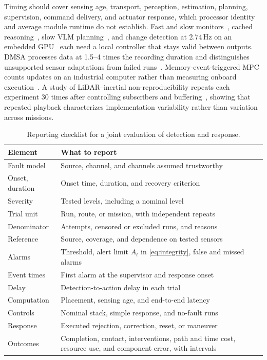 Timing should cover sensing age, transport, perception, estimation, planning, supervision, command delivery, and actuator response, which processor identity and average module runtime do not establish. Fast and slow monitors~\cite{P_F07}, cached reasoning~\cite{P_E60}, slow VLM planning~\cite{P_R26}, and change detection at 2.74\,Hz on an embedded GPU~\cite{P_R07} each need a local controller that stays valid between outputs. DMSA processes data at 1.5--4 times the recording duration and distinguishes unsupported sensor adaptations from failed runs~\cite{P_N20}. Memory-event-triggered MPC counts updates on an industrial computer rather than measuring onboard execution~\cite{P_N14}. A study of LiDAR--inertial non-reproducibility repeats each experiment 30 times after controlling subscribers and buffering~\cite{P_N04}, showing that repeated playback characterizes implementation variability rather than variation across missions.

\begin{table}[!t]
\centering
\caption{Reporting checklist for a joint evaluation of detection and response.}
\label{tab:checklist}
\surveytableformat
\begin{tabularx}{\linewidth}{@{}L{1.9cm}Y@{}}
\toprule
\textbf{Element} & \textbf{What to report} \\
\midrule
Fault model & Source, channel, and channels assumed trustworthy \\
Onset, duration & Onset time, duration, and recovery criterion \\
Severity & Tested levels, including a nominal level \\
Trial unit & Run, route, or mission, with independent repeats \\
Denominator & Attempts, censored or excluded runs, and reasons \\
Reference & Source, coverage, and dependence on tested sensors \\
Alarms & Threshold, alert limit $A_t$ in \eqref{eq:integrity}, false and missed alarms \\
Event times & First alarm at the supervisor and response onset \\
Delay & Detection-to-action delay in each trial \\
Computation & Placement, sensing age, and end-to-end latency \\
Controls & Nominal stack, simple response, and no-fault runs \\
Response & Executed rejection, correction, reset, or maneuver \\
Outcomes & Completion, contact, interventions, path and time cost, resource use, and component error, with intervals \\
\bottomrule
\end{tabularx}
\end{table}

